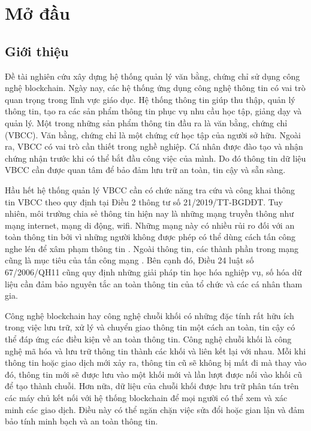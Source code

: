 \chapter{Mở đầu}

\section{Giới thiệu}

Đề tài nghiên cứu xây dựng hệ thống quản lý văn bằng, chứng chỉ sử dụng công nghệ blockchain.
Ngày nay, các hệ thống ứng dụng công nghệ thông tin có vai trò quan trọng trong lĩnh vực giáo dục.
Hệ thống thông tin giúp thu thập, quản lý thông tin, tạo ra các sản phẩm thông tin phục vụ nhu cầu học tập, giảng dạy và quản lý.
Một trong những sản phẩm thông tin đầu ra là văn bằng, chứng chỉ (VBCC).
Văn bằng, chứng chỉ là một chứng cứ học tập của người sở hữu.
Ngoài ra, VBCC có vai trò cần thiết trong nghề nghiệp.
Cá nhân được đào tạo và nhận chứng nhận trước khi có thể bắt đầu công việc của mình.
Do đó thông tin dữ liệu VBCC cần được quan tâm để bảo đảm lưu trữ an toàn, tin cậy và sẵn sàng.

Hầu hết hệ thống quản lý VBCC cần có chức năng tra cứu và công khai thông tin VBCC theo quy định tại Điều 2 thông tư số 21/2019/TT-BGDĐT.
Tuy nhiên, môi trường chia sẻ thông tin hiện nay là những mạng truyền thông như mạng internet, mạng di động, wifi.
Những mạng này có nhiều rủi ro đối với an toàn thông tin bởi vì những người không được phép có thể dùng cách tấn công nghe lén để xâm phạm thông tin \cite{phạmnguyênkhang2013}.
Ngoài thông tin, các thành phần trong mạng cũng là mục tiêu của tấn công mạng \cite{dothanhnghi2018}.
Bên cạnh đó, Điều 24 luật số 67/2006/QH11 cũng quy định những giải pháp tin học hóa nghiệp vụ, số hóa dữ liệu cần đảm bảo nguyên tắc an toàn thông tin của tổ chức và các cá nhân tham gia.

Công nghệ blockchain hay công nghệ chuỗi khối có những đặc tính rất hữu ích trong việc lưu trữ, xử lý và chuyển giao thông tin một cách an toàn, tin cậy có thể đáp ứng các điều kiện về an toàn thông tin.
Công nghệ chuỗi khối là công nghệ mã hóa và lưu trữ thông tin thành các khối và liên kết lại với nhau.
Mỗi khi thông tin hoặc giao dịch mới xảy ra, thông tin cũ sẽ không bị mất đi mà thay vào đó, thông tin mới sẽ được lưu vào một khối mới và lần lượt được nối vào khối cũ để tạo thành chuỗi.
Hơn nữa, dữ liệu của chuỗi khối được lưu trữ phân tán trên các máy chủ kết nối với hệ thống blockchain để mọi người có thể xem và xác minh các giao dịch. Điều này có thể ngăn chặn việc sửa đổi hoặc gian lận và đảm bảo tính minh bạch và an toàn thông tin.

